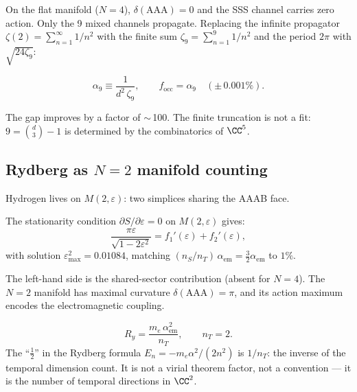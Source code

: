 On the flat manifold ($N=4$), $\delta(\mathrm{AAA}) = 0$ and the SSS channel carries zero action.  Only the 9 mixed channels propagate.  Replacing the infinite propagator $\zeta(2) = \sum_{n=1}^\infty 1/n^2$ with the finite sum $\zeta_9 = \sum_{n=1}^9 1/n^2$ and the period $2\pi$ with $\sqrt{24\zeta_9}$:

\begin{equation}
\alpha_9 \equiv \frac{1}{d^2\,\zeta_9}, \qquad
f_\mathrm{occ} = \alpha_9 \quad (\pm\,0.001\%).
\end{equation}

The gap improves by a factor of $\sim$\,100.  The finite truncation is not a fit: $9 = \binom{d}{3} - 1$ is determined by the combinatorics of $\CC^5$.

\subsection{Rydberg as $N=2$ manifold counting}
\label{sec:rydberg_N2}

Hydrogen lives on $M(2,\varepsilon)$: two simplices sharing the AAAB face.

\begin{theorem}[$N=2$ stationarity]
\label{thm:N2_stationarity}
The stationarity condition $\partial S/\partial\varepsilon = 0$ on $M(2,\varepsilon)$ gives:
\begin{equation}
\frac{\pi\varepsilon}{\sqrt{1 - 2\varepsilon^2}} = f_1'(\varepsilon) + f_2'(\varepsilon),
\end{equation}
with solution $\varepsilon_{\max}^2 = 0.01084$, matching $(n_S/n_T)\,\alpha_\text{em} = \tfrac{3}{2}\alpha_\text{em}$ to $1\%$.
\end{theorem}

The left-hand side is the shared-sector contribution (absent for $N=4$).  The $N=2$ manifold has maximal curvature $\delta(\mathrm{AAA}) = \pi$, and its action maximum encodes the electromagnetic coupling.

\begin{theorem}
\label{thm:rydberg_counting}
\begin{equation}
\boxed{R_y = \frac{m_e\,\alpha_\text{em}^2}{n_T}, \qquad n_T = 2.}
\end{equation}
The ``$\tfrac{1}{2}$'' in the Rydberg formula $E_n = -m_e\alpha^2/(2n^2)$ is $1/n_T$: the inverse of the temporal dimension count.  It is not a virial theorem factor, not a convention --- it is the number of temporal directions in $\CC^2$.
\end{theorem}


